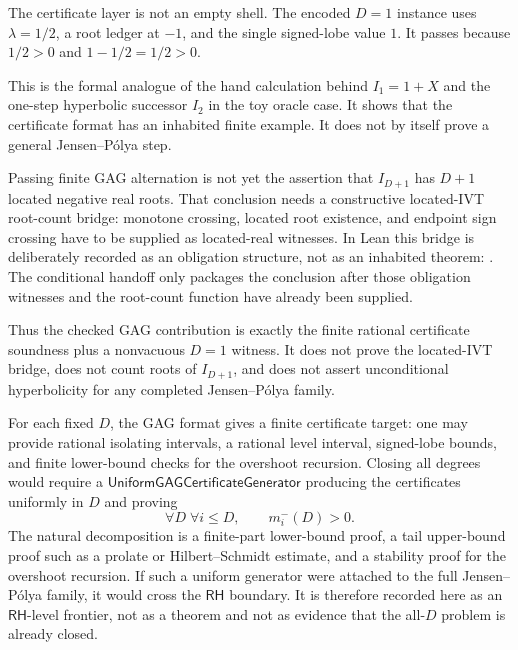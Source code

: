 \begin{principle}
\label{prin:rh-gag-nonvacuous-one-step-witness}
The certificate layer is not an empty shell.  The encoded $D=1$ instance
uses $\lambda=1/2$, a root ledger at $-1$, and the single signed-lobe
value $1$.  It passes because $1/2>0$ and $1-1/2=1/2>0$.
\end{principle}

This is the formal analogue of the hand calculation behind
$I_1=1+X$ and the one-step hyperbolic successor $I_2$ in the toy oracle
case.  It shows that the certificate format has an inhabited finite
example.  It does not by itself prove a general Jensen--P\'olya step.

\begin{principle}
\label{prin:rh-gag-located-ivt-obligation}
Passing finite GAG alternation is not yet the assertion that
$I_{D+1}$ has $D+1$ located negative real roots.  That conclusion needs a
constructive located-IVT root-count bridge: monotone crossing, located
root existence, and endpoint sign crossing have to be supplied as
located-real witnesses.  In Lean this bridge is deliberately recorded as
an obligation structure, not as an inhabited theorem:
.
The conditional handoff
only packages the conclusion after those obligation witnesses and the
root-count function have already been supplied.
\end{principle}

Thus the checked GAG contribution is exactly the finite rational
certificate soundness plus a nonvacuous $D=1$ witness.  It does not prove
the located-IVT bridge, does not count roots of $I_{D+1}$, and does not
assert unconditional hyperbolicity for any completed Jensen--P\'olya
family.

\begin{principle}
\label{prin:rh-gag-uniform-generator-frontier}
For each fixed $D$, the GAG format gives a finite certificate target:
one may provide rational isolating intervals, a rational level interval,
signed-lobe bounds, and finite lower-bound checks for the overshoot
recursion.  Closing all degrees would require a
$\mathsf{UniformGAGCertificateGenerator}$ producing the certificates
uniformly in $D$ and proving
$$
\forall D\;\forall i\le D,\qquad m_i^-(D)>0.
$$
The natural decomposition is a finite-part lower-bound proof, a tail
upper-bound proof such as a prolate or Hilbert--Schmidt estimate, and a
stability proof for the overshoot recursion.  If such a uniform generator
were attached to the full Jensen--P\'olya family, it would cross the
$\mathsf{RH}$ boundary.  It is therefore recorded here as an
$\mathsf{RH}$-level frontier, not as a theorem and not as evidence that
the all-$D$ problem is already closed.
\end{principle}

